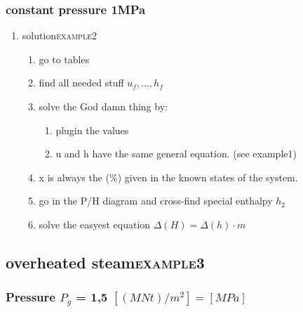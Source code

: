 \documentclass[11pt]{article}
\begin{document}
\subsubsection{constant pressure 1MPa}
\label{sec:org098aaa8}
\begin{enumerate}
\item solution\hfill{}\textsc{example2}
\label{sec:orgc8b353b}
\begin{enumerate}
\item go to tables
\item find all needed stuff
\(u_{f},...,h_{f}\)
\item solve the God damn thing by:
\begin{enumerate}
\item plugin the values
\item u and h have the same general equation. (see example1)
\end{enumerate}
\item x is always the (\%) given in the known states of the system.
\item go in the P/H diagram and cross-find special enthalpy
\(h_{2}\)
\item solve the easyest  equation
\(\Delta(H) = \Delta(h) \cdot m\)
\end{enumerate}
\end{enumerate}
\subsection{overheated steam\hfill{}\textsc{example3}}
\label{sec:orgdf0e6ef}
\subsubsection{Pressure \(P_{g}\) = 1,5 \([(MNt)/m^2]=[MPa]\)}
\label{sec:org05df083}
\end{document}
